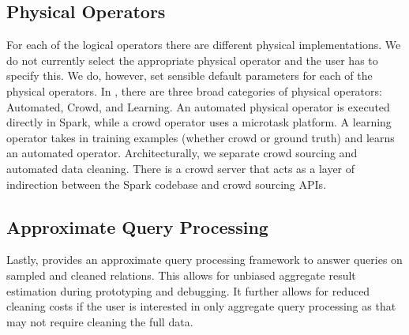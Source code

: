 \subsection{Physical Operators}
For each of the logical operators there are different physical implementations.
We do not currently select the appropriate physical operator and the user has to specify this.
We do, however, set sensible default parameters for each of the physical operators.
In \projx, there are three broad categories of physical operators: Automated, Crowd, and Learning.
An automated physical operator is executed directly in Spark, while a crowd operator uses a microtask platform.
A learning operator takes in training examples (whether crowd or ground truth) and learns an automated operator.
Architecturally, we separate crowd sourcing and automated data cleaning.
There is a crowd server that acts as a layer of indirection between the Spark codebase and crowd sourcing APIs.

\subsection{Approximate Query Processing}
Lastly, \projx provides an approximate query processing framework to answer queries on sampled and cleaned relations.
This allows for unbiased aggregate result estimation during prototyping and debugging.
It further allows for reduced cleaning costs if the user is interested in only aggregate query processing as that may
not require cleaning the full data.  







